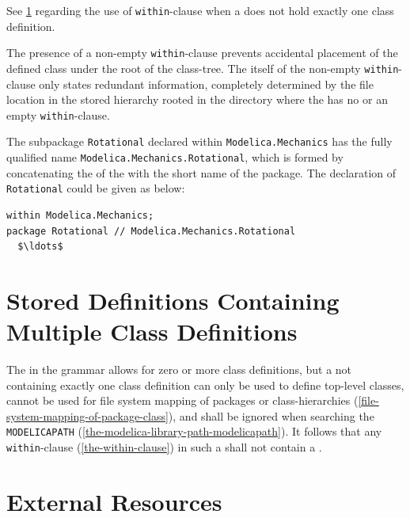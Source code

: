 See \cref{stored-definitions-containing-multiple-class-definitions} regarding the use of \lstinline!within!-clause when a  does not hold exactly one class definition.

\begin{nonnormative}
The presence of a non-empty \lstinline!within!-clause prevents accidental placement of the defined class under the root of the class-tree.
The  itself of the non-empty \lstinline!within!-clause only states redundant information, completely determined by the file location in the stored hierarchy rooted in the directory where the  has no or an empty \lstinline!within!-clause.
\end{nonnormative}

\begin{example}
The subpackage \lstinline!Rotational! declared within \lstinline!Modelica.Mechanics! has the fully qualified name \lstinline!Modelica.Mechanics.Rotational!, which is formed by concatenating the  of the  with the short name of the package.
The declaration of \lstinline!Rotational! could be given as below:
\begin{lstlisting}[language=modelica]
within Modelica.Mechanics;
package Rotational // Modelica.Mechanics.Rotational
  $\ldots$
\end{lstlisting}
\end{example}


\section{Stored Definitions Containing Multiple Class Definitions}\label{stored-definitions-containing-multiple-class-definitions}

The  in the grammar allows for zero or more class definitions, but a  not containing exactly one class definition can only be used to define top-level classes, cannot be used for file system mapping of packages or class-hierarchies (\cref{file-system-mapping-of-package-class}), and shall be ignored when searching the \lstinline!MODELICAPATH! (\cref{the-modelica-library-path-modelicapath}).
It follows that any \lstinline!within!-clause (\cref{the-within-clause}) in such a  shall not contain a .


\section{External Resources}\label{external-resources}

